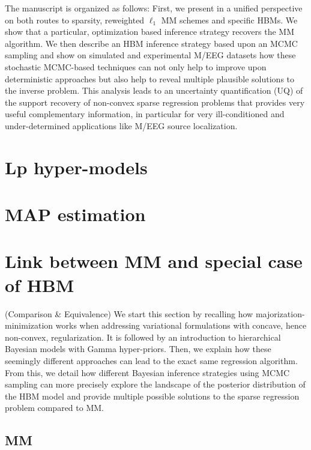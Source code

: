 The manuscript is organized as follows: First, we present in a unified
perspective on both routes to sparsity, \ie reweighted $\ell_1$ MM schemes
and specific HBMs. We show that a particular, optimization based inference strategy recovers the MM algorithm. We then describe an HBM inference strategy based upon an MCMC sampling and show on simulated and experimental M/EEG datasets how these stochastic MCMC-based techniques can not only help to improve upon deterministic approaches but also help to reveal multiple plausible solutions to the inverse problem. This analysis leads to an uncertainty quantification (UQ) of the support recovery of non-convex sparse regression problems that provides very useful complementary information, in particular for very ill-conditioned and under-determined applications like M/EEG source localization.

\section{Lp hyper-models}

\section{MAP estimation}

\section{Link between MM and special case of HBM}
(Comparison \& Equivalence)
We start this section by recalling how majorization-minimization works
when addressing variational formulations with concave, hence non-convex, regularization.
It is followed by an introduction to hierarchical Bayesian models with Gamma hyper-priors.
Then, we explain how these seemingly different approaches can lead to the
exact same regression algorithm.
From this, we detail how different Bayesian inference strategies using MCMC
sampling can more precisely explore the landscape of the posterior distribution of the HBM model and provide multiple possible solutions to the sparse regression problem compared to MM.

\subsection{MM}
\label{sub:MM}

